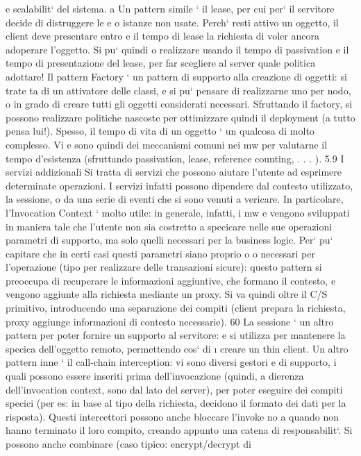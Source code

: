 \documentclass[a4paper,12pt]{article}
\begin{document}
e
scalabilit` del sistema.
a
Un pattern simile ` il lease, per cui per` il servitore decide di distruggere le
e
o
istanze non usate. Perch` resti attivo un oggetto, il client deve presentare entro
e
il tempo di lease la richiesta di voler ancora adoperare l'oggetto. Si pu` quindi
o
realizzare usando il tempo di passivation e il tempo di presentazione del lease,
per far scegliere al server quale politica adottare!
Il pattern Factory ` un pattern di supporto alla creazione di oggetti: si trate
ta di un attivatore delle classi, e si pu` pensare di realizzarne uno per nodo,
o
in grado di creare tutti gli oggetti considerati necessari. Sfruttando il factory,
si possono realizzare politiche nascoste per ottimizzare quindi il deployment (a
tutto pensa lui!).
Spesso, il tempo di vita di un oggetto ` un qualcosa di molto complesso. Vi
e
sono quindi dei meccanismi comuni nei mw per valutarne il tempo d'esistenza
(sfruttando passivation, lease, reference counting, . . . ).
5.9
I servizi addizionali
Si tratta di servizi che possono aiutare l'utente ad esprimere determinate operazioni. I servizi infatti possono
dipendere dal contesto utilizzato, la sessione, o
da una serie di eventi che si sono venuti a vericare.
In particolare, l'Invocation Context ` molto utile: in generale, infatti, i mw
e
vengono sviluppati in maniera tale che l'utente non sia costretto a specicare
nelle sue operazioni parametri di supporto, ma solo quelli necessari per la business logic. Per` pu` capitare che in
certi casi questi parametri siano proprio
o
o
necessari per l'operazione (tipo per realizzare delle transazioni sicure): questo
pattern si preoccupa di recuperare le informazioni aggiuntive, che formano il
contesto, e vengono aggiunte alla richiesta mediante un proxy. Si va quindi
oltre il C/S primitivo, introducendo una separazione dei compiti (client prepara
la richiesta, proxy aggiunge informazioni di contesto necessarie).
60
La sessione ` un altro pattern per poter fornire un supporto al servitore:
e
si utilizza per mantenere la specica dell'oggetto remoto, permettendo cos` di
\i{}
creare un thin client.
Un altro pattern inne ` il call-chain interception: vi sono diversi gestori
e
di supporto, i quali possono essere inseriti prima dell'invocazione (quindi, a
dierenza dell'invocation context, sono dal lato del server), per poter eseguire
dei compiti specici (per es: in base al tipo della richiesta, decidono il formato
dei dati per la risposta). Questi intercettori possono anche bloccare l'invoke no
a quando non hanno terminato il loro compito, creando appunto una catena di
responsabilit`. Si possono anche combinare (caso tipico: encrypt/decrypt di
\end{document}
